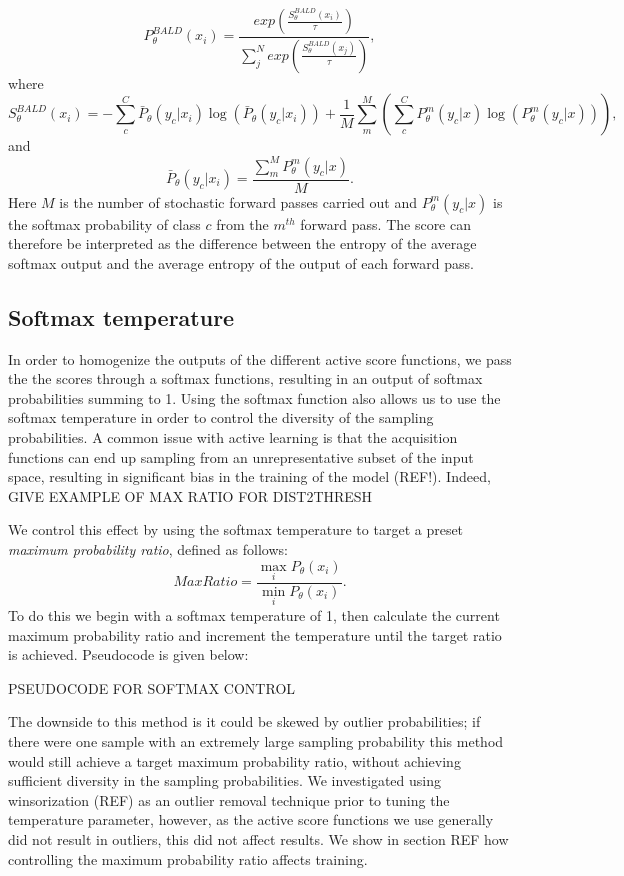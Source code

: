 \begin{equation}
P_{\theta}^{BALD} (x_i) = \frac{exp(\frac{S^{BALD}_{\theta}(x_i)}{\tau})}{\sum_{j}^{N} exp(\frac{S^{BALD}_{\theta}(x_j)}{\tau})},
\end{equation}
where
\begin{equation}
S^{BALD}_{\theta}(x_i) = - \sum_{c}^{C} \bar{P}_{\theta}(y_c|x_i)\log( \bar{P}_{\theta}(y_c|x_i)) + \frac{1}{M} \sum_{m}^{M} (\sum_{c}^{C} P^{m}_{\theta}(y_c|x)\log(P^{m}_{\theta}(y_c|x))),
\end{equation}
and
\begin{equation}
 \bar{P}_{\theta}(y_c|x_i) = \frac{\sum_{m}^{M}P^{m}_{\theta}(y_c|x)}{M}. 
\end{equation}
Here $M$ is the number of stochastic forward passes carried out and $P^{m}_{\theta}(y_c|x)$ is the softmax probability of class $c$ from the $m^{th}$ forward pass. The score can therefore be interpreted as the difference between the entropy of the average softmax output and the average entropy of the output of each forward pass.
\subsection{Softmax temperature}\label{Methods_SoftmaxTemperature}
In order to homogenize the outputs of the different active score functions, we pass the the scores through a softmax functions, resulting in an output of softmax probabilities summing to 1. Using the softmax function also allows us to use the softmax temperature in order to control the diversity of the sampling probabilities. A common issue with active learning is that the acquisition functions can end up sampling from an unrepresentative subset of the input space, resulting in significant bias in the training of the model (REF!). Indeed, GIVE EXAMPLE OF MAX RATIO FOR DIST2THRESH

We control this effect by using the softmax temperature to target a preset \textit{maximum probability ratio}, defined as follows:
\begin{equation}
Max Ratio = \frac{\max_{i} P_\theta(x_i)}{\min_{i} P_\theta(x_i)}.
\end{equation}
To do this we begin with a softmax temperature of 1, then calculate the current maximum probability ratio and increment the temperature until the target ratio is achieved. Pseudocode is given below:

PSEUDOCODE FOR SOFTMAX CONTROL

The downside to this method is it could be skewed by outlier probabilities; if there were one sample with an extremely large sampling probability this method would still achieve a target maximum probability ratio, without achieving sufficient diversity in the sampling probabilities. We investigated using winsorization (REF) as an outlier removal technique prior to tuning the temperature parameter, however, as the active score functions we use generally did not result in outliers, this did not affect results.  We show in section REF how controlling the maximum probability ratio affects training. 


